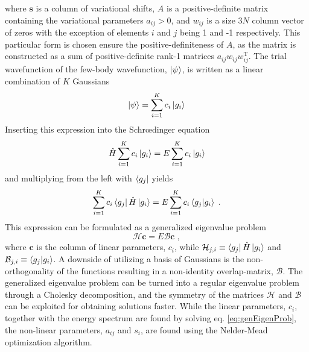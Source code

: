 where $\boldsymbol{s}$ is a column of variational shifts, $A$ is a positive-definite matrix containing the variational parameters $a_{ij} > 0$, and $w_{ij}$ is a size $3 N$ column vector of zeros with the exception of elements $i$ and $j$ being 1 and -1 respectively. 
This particular form is chosen ensure the positive-definiteness of $A$, as the matrix is constructed as a sum of positive-definite rank-1 matrices $a_{ij}  w_{ij} w_{ij}^{\mathrm{T}}$. 
The trial wavefunction of the few-body wavefunction, $\ket{\psi}$, is written as a linear combination of $K$ Gaussians
\begin{equation}
	\ket{\psi} = \sum_{i = 1}^{K} c_i \ket{g_i}
\end{equation}
Inserting this expression into the Schr\oe dinger equation
\begin{equation}
	\hat{H} \sum_{i=1}^{K} c_{i} \ket{g_i} = E \sum_{i=1}^{K} c_{i} \ket{g_i} 
\end{equation}
and multiplying from the left with $\bra{g_j}$ yields
\begin{equation}
	\sum_{i=1}^{K} c_{i} \bra{g_j} \hat{H} \ket{g_i} = E \sum_{i=1}^{K} c_{i} \braket{g_j | g_i} \; .
\end{equation}
This expression can be formulated as a generalized eigenvalue problem
\begin{equation}
	\mathcal{H} \boldsymbol{c} = E \mathcal{B} \boldsymbol{c} \; ,
	\label{eq:genEigenProb}
\end{equation}
where $\boldsymbol{c}$ is the column of linear parameters, $c_i$, while $\mathcal{H}_{j,i} \equiv \bra{g_j} \hat{H} \ket{g_i}$ and $\mathcal{B}_{j,i} \equiv \braket{g_j | g_i}$. A downside of utilizing a basis of Gaussians is the non-orthogonality of the functions resulting in a non-identity overlap-matrix, $\mathcal{B}$. The generalized eigenvalue problem can be turned into a regular eigenvalue problem through a Cholesky decomposition, and the symmetry of the matrices $\mathcal{H}$ and $\mathcal{B}$ can be exploited for obtaining solutions faster. 
While the linear parameters, $c_i$, together with the energy spectrum are found by solving eq. \eqref{eq:genEigenProb}, the non-linear parameters, $a_{ij}$ and $s_i$, are found using the Nelder-Mead optimization algorithm. 


